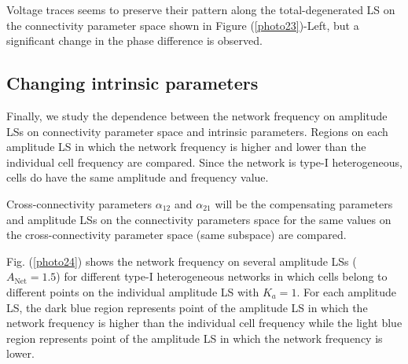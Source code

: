Voltage traces seems to preserve their pattern along the total-degenerated LS on the connectivity parameter space shown in Figure (\ref{photo23})-Left, but a significant change in the phase difference is observed.


\subsection{Changing intrinsic parameters}
Finally, we study the dependence between the network frequency on amplitude LSs on connectivity parameter space and intrinsic parameters. Regions on each amplitude LS in which the network frequency is higher and lower than the individual cell frequency are compared. Since the network is type-\textrm{I} heterogeneous, cells do have the same amplitude and frequency value.

Cross-connectivity parameters $\alpha_{12}$ and $\alpha_{21}$ will be the compensating parameters and amplitude LSs on the connectivity parameters space for the same values on the cross-connectivity parameter space (same subspace) are compared.

Fig. (\ref{photo24}) shows the network frequency on several amplitude LSs ($A_{\text{Net}} = 1.5$) for different type-\textrm{I} heterogeneous networks in which cells belong to different points on the individual amplitude LS with $K_{a}=1$. For each amplitude LS, the dark blue region represents point of the amplitude LS in which the network frequency is higher than the individual cell frequency while the light blue region represents point of the amplitude LS in which the network frequency is lower.


